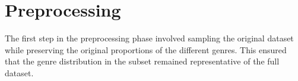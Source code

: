 \chapter{Preprocessing}
\label{ch:capitolo2}

The first step in the preprocessing phase involved sampling the original dataset while preserving the original proportions of the different genres. 
This ensured that the genre distribution in the subset remained representative of the full dataset.
